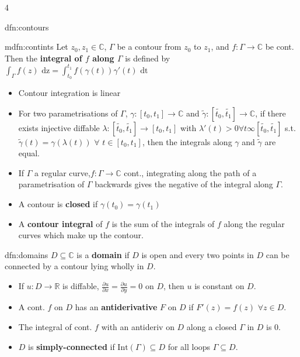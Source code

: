 \documentclass[landscape, 8pt]{extarticle}
\begin{document}
\begin{multicols*}{4}
\begin{dfn}{dfn:contours}{ }
	\end{dfn}
	
	
	\begin{mdfn}{mdfn:contints}{ }
		Let $z_0, z_1 \in \mathbb{C}$, $\Gamma$ be a contour from $z_0$ to $z_1$, and $f: \Gamma \to \mathbb{C}$ be cont. Then the \textbf{integral of $f$ along $\Gamma$} is defined by $\int_{\Gamma} f(z) \text{ dz} = \int_{t_0}^{t_1} f(\gamma(t))\gamma'(t) \text{ dt}$
		\begin{itemize}
			\item Contour integration is linear
			\item For two parametrisations of $\Gamma$, $\gamma : [t_0, t_1] \to \mathbb{C}$ and $\tilde{\gamma}:[\tilde{t_0}, \tilde{t_1}] \to \mathbb{C}$, if there exists injective diffable $\lambda:[\tilde{t_0}, \tilde{t_1}] \to [t_0, t_1]$ with $\lambda'(t) > 0 \forall t \infty [\tilde{t_0}, \tilde{t_1}]$ s.t. $\tilde{\gamma}(t) = \gamma(\lambda(t))$ $\forall$ $t \in [t_0, t_1]$, then the integrals along $\gamma$ and $\tilde{\gamma}$ are equal.
			\item If $\Gamma$ a regular curve,$f: \Gamma \to \mathbb{C}$ cont., integrating along the path of a parametrisation of $\Gamma$ backwards gives the negative of the integral along $\Gamma$.
			\item A contour is \textbf{closed} if $\gamma(t_0) = \gamma(t_1)$
			\item A \textbf{contour integral} of $f$ is the sum of the integrals of $f$ along the regular curves which make up the contour.
		\end{itemize}
		
	\end{mdfn}
	
	
	\begin{dfn}[Domains]{dfn:domains}{ }
		$D \subseteq \mathbb{C}$ is a \textbf{domain} if $D$ is open and every two points in $D$ can be connected by a contour lying wholly in $D$.
		\begin{itemize}
			\item If $u : D \to \mathbb{R}$ is diffable, $\frac{\partial u}{\partial x} = \frac{\partial u}{\partial y} = 0$ on $D$, then $u$ is constant on $D$.
			\vspace{-2pt}
			\item A cont. $f$ on $D$ has an \textbf{antiderivative} $F$ on $D$ if $F'(z) = f(z)$ $\forall z \in D$.
			\item The integral of cont. $f$ with an antideriv on $D$ along a closed $\Gamma$ in $D$ is $0$.
			\item $D$ is \textbf{simply-connected} if $\text{Int}(\Gamma) \subseteq D$ for all loops $\Gamma \subseteq D$.
		\end{itemize}
		

\end{dfn}
\end{multicols*}
\end{document}
